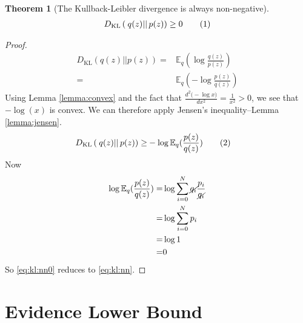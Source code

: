 \documentclass[]{article}
\newcommand{\Expectation} {\mathbb{E}}
\newcommand{\KLD}[2]{D_{\mathrm{KL}} \left( \left. \left. #1 \right|\right| #2 \right) }
\newcommand\numberthis    {\addtocounter{equation}{1}\tag{\theequation}}
\newtheorem{thm}{Theorem}
\begin{document}
\begin{thm}[The Kullback-Leibler divergence is always non-negative]\label{thm:kl:ge}
	\begin{align*}
		\KLD{q(z)}{p(z)} \ge 0 \numberthis \label{eq:kl:nn}
	\end{align*}
\end{thm}
\begin{proof}
	\begin{align*}
		\KLD{q(z)}{p(z)} = & \Expectation_q(\log{\frac{q(z)}{p(z)}})\\
        = & \Expectation_q(-\log{\frac{p(z)}{q(z)}})
	\end{align*}
	Using Lemma \ref{lemma:convex} and the fact that $\frac{d^2\big(-\log{x}\big)}{dx^2}=\frac{1}{x^2}>0$, we see that $-\log(x)$ is convex. We can therefore apply Jensen's inequality--Lemma \ref{lemma:jensen}.
	\begin{align*}
		\KLD{q(z)}{p(z)} \ge &-\log{\Expectation_q(\frac{p(z)}{q(z)})} \numberthis \label{eq:kl:nn0}
	\end{align*}
	Now
	\begin{align*}
		\log{\Expectation_q(\frac{p(z)}{q(z)})} =& \log{\sum_{i=0}^{N}\cancel{q_i}\frac{p_i}{\cancel{q_i}}}\\
		=& \log{\sum_{i=0}^{N}p_i}\\
		=& \log{1}\\
		=& 0
	\end{align*}
   So \eqref{eq:kl:nn0} reduces to \eqref{eq:kl:nn}.
\end{proof}

\section{Evidence Lower Bound}\label{sect:elbo}
\end{document}
